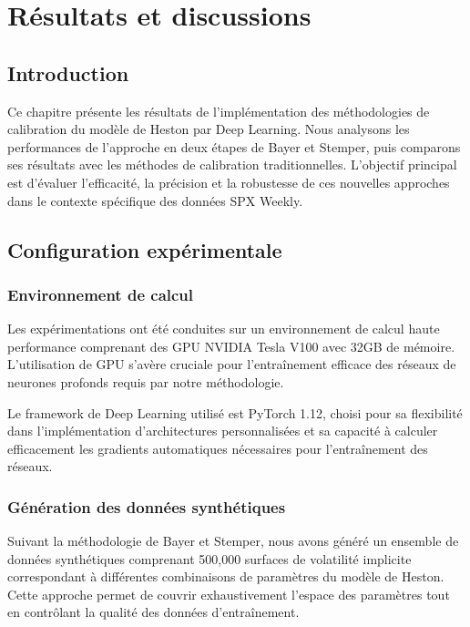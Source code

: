 \chapter{Résultats et discussions}

\section{Introduction}

Ce chapitre présente les résultats de l'implémentation des méthodologies de calibration du modèle de Heston par Deep Learning. Nous analysons les performances de l'approche en deux étapes de Bayer et Stemper, puis comparons ses résultats avec les méthodes de calibration traditionnelles. L'objectif principal est d'évaluer l'efficacité, la précision et la robustesse de ces nouvelles approches dans le contexte spécifique des données SPX Weekly.

\section{Configuration expérimentale}

\subsection{Environnement de calcul}

Les expérimentations ont été conduites sur un environnement de calcul haute performance comprenant des GPU NVIDIA Tesla V100 avec 32GB de mémoire. L'utilisation de GPU s'avère cruciale pour l'entraînement efficace des réseaux de neurones profonds requis par notre méthodologie.

Le framework de Deep Learning utilisé est PyTorch 1.12, choisi pour sa flexibilité dans l'implémentation d'architectures personnalisées et sa capacité à calculer efficacement les gradients automatiques nécessaires pour l'entraînement des réseaux.

\subsection{Génération des données synthétiques}

Suivant la méthodologie de Bayer et Stemper, nous avons généré un ensemble de données synthétiques comprenant 500,000 surfaces de volatilité implicite correspondant à différentes combinaisons de paramètres du modèle de Heston. Cette approche permet de couvrir exhaustivement l'espace des paramètres tout en contrôlant la qualité des données d'entraînement.

